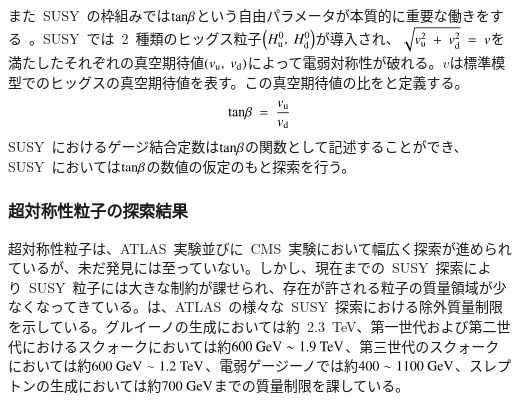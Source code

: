 また~SUSY~の枠組みでは$\rm{tan}\beta$という自由パラメータが本質的に重要な働きをする~\cite{URL:24}。SUSY~では~2~種類のヒッグス粒子$\left(H_{\rm{u}}^0,~H_{\rm{d}}^0\right)$が導入され、$\sqrt{v_{\rm{u}}^2~+~v_{\rm{d}}^2}~=~v$を満たしたそれぞれの真空期待値$(v_{\rm{u}},~v_{\rm{d}})$によって電弱対称性が破れる。$v$は標準模型でのヒッグスの真空期待値を表す。この真空期待値の比をと定義する。
\begin{align}
    \rm{tan}\beta~=~\frac{\it v_{\rm{u}}}{\it v_{\rm{d}}} \label{eq:tan}
\end{align}
SUSY~におけるゲージ結合定数は$\rm{tan}\beta$の関数として記述することができ、SUSY~においては$\rm{tan}\beta$の数値の仮定のもと探索を行う。

\subsubsection{超対称性粒子の探索結果}
超対称性粒子は、ATLAS~実験並びに~CMS~実験において幅広く探索が進められているが、未だ発見には至っていない。しかし、現在までの~SUSY~探索により~SUSY~粒子には大きな制約が課せられ、存在が許される粒子の質量領域が少なくなってきている。は、ATLAS~の様々な~SUSY~探索における除外質量制限を示している。グルイーノの生成においては約~2.3~TeV、第一世代および第二世代におけるスクォークにおいては約$\rm{600~GeV\sim1.9~TeV}$、第三世代のスクォークにおいては約$\rm{600~GeV\sim1.2~TeV}$、電弱ゲージーノでは約$\rm{400\sim1100~GeV}$、スレプトンの生成においては約$\rm{700~GeV}$までの質量制限を課している。

